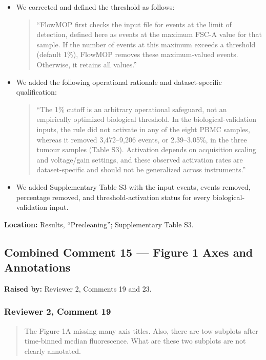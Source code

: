 \documentclass[
  11pt,
  a4paper,
]{article}
\begin{document}
\begin{itemize}
\item
  We corrected and defined the threshold as follows:

  \begin{quote}
  ``FlowMOP first checks the input file for events at the limit of
  detection, defined here as events at the maximum FSC-A value for that
  sample. If the number of events at this maximum exceeds a threshold
  (default 1\%), FlowMOP removes these maximum-valued events. Otherwise,
  it retains all values.''
  \end{quote}
\item
  We added the following operational rationale and dataset-specific
  qualification:

  \begin{quote}
  ``The 1\% cutoff is an arbitrary operational safeguard, not an
  empirically optimized biological threshold. In the
  biological-validation inputs, the rule did not activate in any of the
  eight PBMC samples, whereas it removed 3,472--9,206 events, or
  2.39--3.05\%, in the three tumour samples (Table S3). Activation
  depends on acquisition scaling and voltage/gain settings, and these
  observed activation rates are dataset-specific and should not be
  generalized across instruments.''
  \end{quote}
\item
  We added Supplementary Table S3 with the input events, events removed,
  percentage removed, and threshold-activation status for every
  biological-validation input.
\end{itemize}

\textbf{Location:} Results, ``Precleaning''; Supplementary Table S3.

\subsection{Combined Comment 15 --- Figure 1 Axes and
Annotations}\label{combined-comment-15--figure-1-axes-and-annotations}

\textbf{Raised by:} Reviewer 2, Comments 19 and 23.

\subsubsection{Reviewer 2, Comment 19}\label{reviewer-2-comment-19}

\begin{quote}
The Figure 1A missing many axis titles. Also, there are tow subplots
after time-binned median fluorescence. What are these two subplots are
not clearly annotated.
\end{quote}
\end{document}
